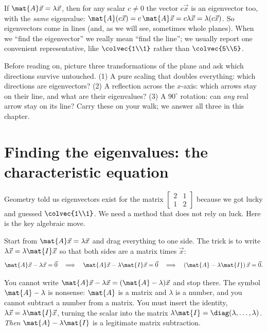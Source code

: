 \begin{remark}
\label{ch23:rem-scaling}
If $\mat{A}\vec{x}=\lambda\vec{x}$, then for any scalar $c\neq 0$ the vector
$c\vec{x}$ is an eigenvector too, with the \emph{same} eigenvalue:
$\mat{A}(c\vec{x})=c\,\mat{A}\vec{x}=c\lambda\vec{x}=\lambda(c\vec{x})$. So
eigenvectors come in lines (and, as we will see, sometimes whole planes). When we
``find the eigenvector'' we really mean ``find the line''; we usually report one
convenient representative, like $\colvec{1\\1}$ rather than $\colvec{5\\5}$.
\end{remark}

\begin{walkbox}
Before reading on, picture three transformations of the plane and ask which
directions survive untouched. (1) A pure scaling that doubles everything: which
directions are eigenvectors? (2) A reflection across the $x$-axis: which arrows
stay on their line, and what are their eigenvalues? (3) A $90^\circ$ rotation:
can \emph{any} real arrow stay on its line? Carry these on your walk; we answer
all three in this chapter.
\end{walkbox}

\section{Finding the eigenvalues: the characteristic equation}
\label{ch23:char}

Geometry told us eigenvectors exist for the matrix $\begin{bmatrix}2&1\\1&2\end{bmatrix}$
because we got lucky and guessed $\colvec{1\\1}$. We need a method that does not
rely on luck. Here is the key algebraic move.

Start from $\mat{A}\vec{x}=\lambda\vec{x}$ and drag everything to one side. The
trick is to write $\lambda\vec{x}=\lambda\mat{I}\vec{x}$ so that both sides are a
matrix times $\vec{x}$:
\[
  \mat{A}\vec{x}-\lambda\vec{x}=\vec{0}
  \quad\Longrightarrow\quad
  \mat{A}\vec{x}-\lambda\mat{I}\vec{x}=\vec{0}
  \quad\Longrightarrow\quad
  (\mat{A}-\lambda\mat{I})\,\vec{x}=\vec{0}.
\]

\begin{trapbox}
You cannot write $\mat{A}\vec{x}-\lambda\vec{x}=(\mat{A}-\lambda)\vec{x}$ and stop
there. The symbol $\mat{A}-\lambda$ is nonsense: $\mat{A}$ is a matrix and
$\lambda$ is a number, and you cannot subtract a number from a matrix. You must
insert the identity, $\lambda\vec{x}=\lambda\mat{I}\vec{x}$, turning the scalar
into the matrix $\lambda\mat{I}=\diag(\lambda,\dots,\lambda)$. \emph{Then}
$\mat{A}-\lambda\mat{I}$ is a legitimate matrix subtraction.
\end{trapbox}

